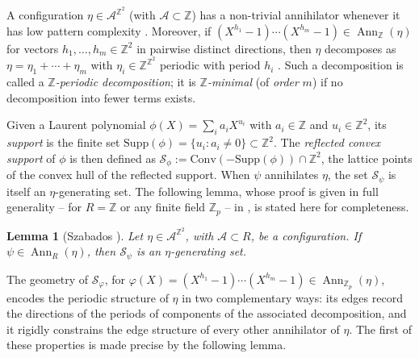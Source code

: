 \documentclass[12pt]{amsart}
\numberwithin{equation}{section}
\newtheorem{lemma}[theorem]{Lemma}
\DeclareMathOperator{\Ann}{Ann}
\newcommand{\bb}[1]{\mathbb{#1}}
\begin{document}
A configuration $\eta\in\mathcal A^{\mathbb Z^2}$ (with $\mathcal A\subset \bb{Z}$) has a
non-trivial annihilator whenever it has low pattern complexity
\cite{KariSzabados20}.  Moreover, if
$(X^{h_1}-1)\cdots(X^{h_m}-1)\in\Ann_{\bb{Z}}(\eta)$ for vectors
$h_1,\ldots,h_m\in\mathbb Z^2$ in pairwise distinct directions, then $\eta$
decomposes as $\eta=\eta_1+\cdots+\eta_m$ with $\eta_i \in \bb{Z}^{\bb{Z}^2}$ periodic with
period $h_i$ \cite{KariSzabados20}. Such a decomposition is called a
\emph{$\mathbb Z$-periodic decomposition}; it is \emph{$\mathbb Z$-minimal} (of
\emph{order} $m$) if no decomposition into fewer terms exists.  

Given a Laurent polynomial $ \phi(X) = \sum_i a_i X^{u_i} $ with $ a_i \in \mathbb{Z} $ and $u_i \in \mathbb{Z}^2$, its \emph{support} is the finite set $ \mathrm{Supp}(\phi) = \{u_i : a_i \neq 0 \} \subset \mathbb{Z}^2 $. The \emph{reflected convex support} of $ \phi $ is then defined as $ \mathcal{S}_\phi := \mathrm{Conv}(-\mathrm{Supp}(\phi)) \cap \mathbb{Z}^2$, the lattice points of the convex hull of the reflected support. When $ \psi $ annihilates $ \eta $, the set $\mathcal{S}_\psi$ is itself an $\eta$-generating set. The
following lemma, whose proof is given in full generality --  for $ R = \mathbb Z $ or any finite field $\bb{Z}_p$ -- in \cite[Lemma~2.4]{Colle22}, is stated here for completeness.

\begin{lemma}[Szabados \cite{Szabados18}] \label{lem:support_generating}
Let $\eta \in \mathcal{A}^{\mathbb Z^2} $, with $ \mathcal A \subset R $, be a configuration. If $ \psi \in \Ann_R(\eta)$, then $ \mathcal S_\psi $ is an $\eta$-generating set.
\end{lemma}

The geometry of $ \mathcal S_\varphi $, for $\varphi(X) = (X^{h_1}-1) \cdots (X^{h_m}-1) \in \Ann_{\bb{Z}_p}(\eta)$, encodes the periodic structure of $\eta$ in two complementary ways: its edges record the directions of the periods of components of the associated decomposition, and it rigidly constrains the edge structure of every other annihilator of $\eta$.  
The first of these properties is made precise by the following lemma.
\end{document}
